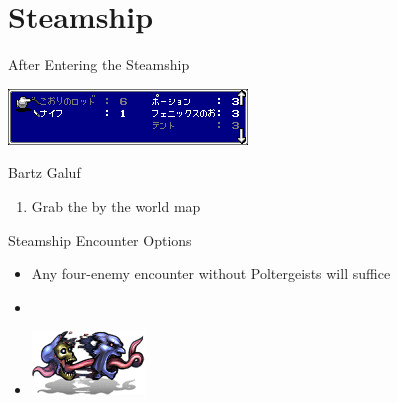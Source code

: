 \chapter{Steamship}

\vspace{\baselineskip}

\begin{paracol}{2}

\begin{menu}{After Entering the Steamship}
    \varwb
    \begin{itemMenu}
        \antidoteMenu {}
        \potionMenu {}
        \item {}
        \item[] \includegraphics[scale=1.24]{../Graphics/Battle/3. Steamship Menu.png}
    \end{itemMenu}
    \begin{rowMenu}
        \swap Bartz \switch Galuf
    \end{rowMenu}
    \varwe
\end{menu}

\begin{enumerate}
    \item Grab the  by the world map
\end{enumerate}

\switchcolumn
\newpage
\begin{steproute}{Steamship Encounter Options}
    \begin{itemize}[leftmargin=*]
        \item[] Any four-enemy encounter without Poltergeists will suffice
        \item[] 
        \item[] \includegraphics{../Graphics/Off Step Route/1. Poltergeist.png}
    \end{itemize}
\end{steproute}


\end{paracol}
